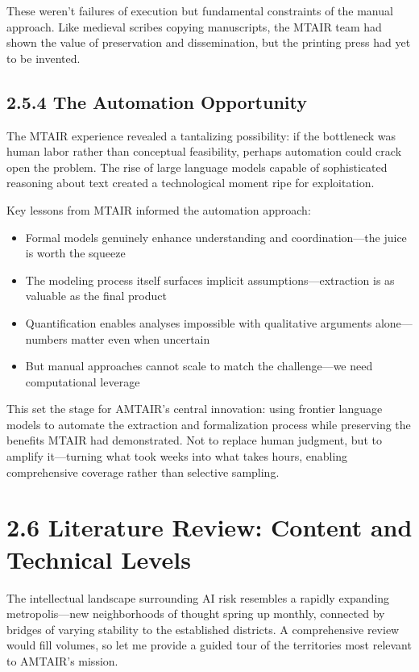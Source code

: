\documentclass[
  11pt,
  letterpaper,
]{book}
\providecommand{\tightlist}{%
  \setlength{\itemsep}{0pt}\setlength{\parskip}{0pt}}
\begin{document}
These weren't failures of execution but fundamental constraints of the
manual approach. Like medieval scribes copying manuscripts, the MTAIR
team had shown the value of preservation and dissemination, but the
printing press had yet to be invented.

\subsection{2.5.4 The Automation
Opportunity}\label{sec-automation-opportunity}

The MTAIR experience revealed a tantalizing possibility: if the
bottleneck was human labor rather than conceptual feasibility, perhaps
automation could crack open the problem. The rise of large language
models capable of sophisticated reasoning about text created a
technological moment ripe for exploitation.

Key lessons from MTAIR informed the automation approach:

\begin{itemize}
\tightlist
\item
  Formal models genuinely enhance understanding and coordination---the
  juice is worth the squeeze
\item
  The modeling process itself surfaces implicit assumptions---extraction
  is as valuable as the final product
\item
  Quantification enables analyses impossible with qualitative arguments
  alone---numbers matter even when uncertain
\item
  But manual approaches cannot scale to match the challenge---we need
  computational leverage
\end{itemize}

This set the stage for AMTAIR's central innovation: using frontier
language models to automate the extraction and formalization process
while preserving the benefits MTAIR had demonstrated. Not to replace
human judgment, but to amplify it---turning what took weeks into what
takes hours, enabling comprehensive coverage rather than selective
sampling.

\section{2.6 Literature Review: Content and Technical
Levels}\label{sec-literature-review}

The intellectual landscape surrounding AI risk resembles a rapidly
expanding metropolis---new neighborhoods of thought spring up monthly,
connected by bridges of varying stability to the established districts.
A comprehensive review would fill volumes, so let me provide a guided
tour of the territories most relevant to AMTAIR's mission.
\end{document}
